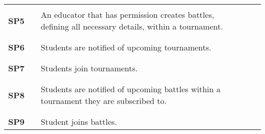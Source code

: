 \begin{longtable}[H]{l l p{8.5cm} l l}
                   &        &                                                                                                                                   &        &                        \\\hline & & \\
    \textbf{SP5}   & \vline & An educator that has permission creates battles, defining all necessary details, within a tournament.                             & \vline &                        \\
                   &        &                                                                                                                                   &        &                        \\\hline & & \\
    \textbf{SP6}   & \vline & Students are notified of upcoming tournaments.                                                                                    & \vline &                        \\
                   &        &                                                                                                                                   &        &                        \\\hline & & \\
    \textbf{SP7}   & \vline & Students join tournaments.                                                                                                        & \vline &                        \\
                   &        &                                                                                                                                   &        &                        \\\hline & & \\
    \textbf{SP8}   & \vline & Students are notified of upcoming battles within a tournament they are subscribed to.                                             & \vline &                        \\
                   &        &                                                                                                                                   &        &                        \\\hline & & \\
    \textbf{SP9}   & \vline & Student joins battles.                                                                                                            & \vline &                        \\

\end{longtable}
